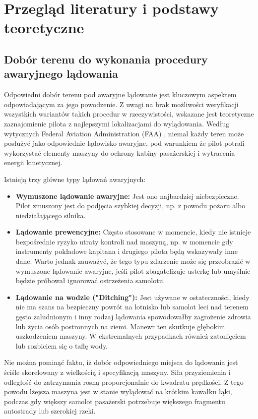 \documentclass[12pt, a4paper]{report}
\begin{document}
\chapter{Przegląd literatury i podstawy teoretyczne}
\section{Dobór terenu do wykonania procedury awaryjnego lądowania}
\par Odpowiedni dobór terenu pod awaryjne lądowanie jest kluczowym aspektem odpowiadającym za jego powodzenie. Z uwagi na brak możliwości weryfikacji wszystkich wariantów takich procedur w rzeczywistości, wskazane jest teoretyczne zaznajomienie pilota z najlepszymi lokalizacjami do wylądowania. Według wytycznych Federal Aviation Administration (FAA) \cite{faa_handbook}, niemal każdy teren może posłużyć jako odpowiednie lądowisko awaryjne, pod warunkiem że pilot potrafi wykorzystać elementy maszyny do ochrony kabiny pasażerskiej i wytracenia energii kinetycznej. 
\par Istnieją trzy główne typy lądowań awaryjnych:
\begin{itemize}
    \item \textbf{Wymuszone lądowanie awaryjne:} Jest ono najbardziej niebezpieczne. Pilot zmuszony jest do podjęcia szybkiej decyzji, np. z powodu pożaru albo niedziałającego silnika.

    \item \textbf{Lądowanie prewencyjne:}  Często stosowane w momencie, kiedy nie istnieje bezpośrednie ryzyko utraty kontroli nad maszyną, np. w momencie gdy instrumenty pokładowe kapitana i drugiego pilota będą wskazywały inne dane. Warto jednak zauważyć, że tego typu zdarzenie może się przeobrazić w wymuszone lądowanie awaryjne, jeśli pilot zbagatelizuje usterkę lub umyślnie będzie próbował ignorować ostrzeżenia samolotu.

    \item \textbf{Lądowanie na wodzie ("Ditching"):} Jest używane w ostateczności, kiedy nie ma szans na bezpieczny powrót na lotnisko lub samolot leci nad terenem gęsto zaludnionym i inny rodzaj lądowania spowodowałby zagrożenie zdrowia lub życia osób postronnych na ziemi. Manewr ten skutkuje głębokim uszkodzeniem maszyny. W ekstremalnych przypadkach również zatonięciem lub rozbiciem się o taflę wody.
\end{itemize}
\par Nie można pominąć faktu, iż dobór odpowiedniego miejsca do lądowania jest ściśle skorelowany z wielkością i specyfikacją maszyny. Siła przyziemienia i odległość do zatrzymania rosną proporcjonalnie do kwadratu prędkości. Z tego powodu lżejsza maszyna jest w stanie wylądować na krótkim kawałku łąki, podczas gdy większy samolot pasażerski potrzebuje większego fragmentu autostrady lub szerokiej rzeki. \cite{ntsb_hudson,ntsb_southern}
\end{document}
